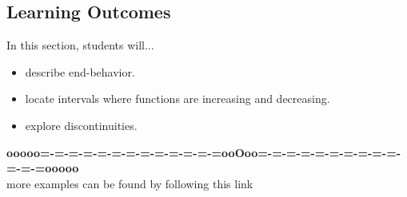 \documentclass{ximera}
\begin{document}
\subsection{Learning Outcomes}

\begin{sectionOutcomes}
In this section, students will...

\begin{itemize}
\item describe end-behavior.
\item locate intervals where functions are increasing and decreasing.
\item explore discontinuities.
\end{itemize}
\end{sectionOutcomes}



















\begin{center}
\textbf{\textcolor{green!50!black}{ooooo=-=-=-=-=-=-=-=-=-=-=-=-=ooOoo=-=-=-=-=-=-=-=-=-=-=-=-=ooooo}} \\

more examples can be found by following this link\\ 

\end{center}
\end{document}
